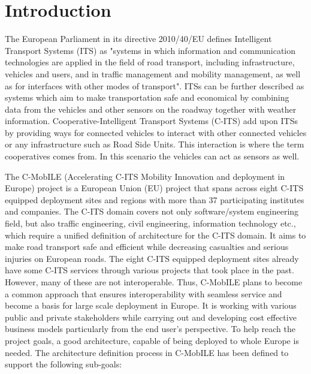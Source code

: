 \documentclass[conference]{IEEEtran}
\begin{document}
\section{Introduction}

The European Parliament in its directive 2010/40/EU \cite{ec} defines Intelligent Transport Systems (ITS) as "systems in which information and communication technologies are applied in the field of road transport, including infrastructure, vehicles and users, and in traffic management and mobility management, as well as for interfaces with other modes of transport".
ITSs can be further described as systems which aim to make transportation safe and economical by combining data from the vehicles and other sensors on the roadway together with weather information.
Cooperative-Intelligent Transport Systems (C-ITS) \cite{c-its} add upon ITSs by providing ways for connected vehicles to interact with other connected vehicles or any infrastructure such as Road Side Units.
This interaction is where the term cooperatives comes from.
In this scenario the vehicles can act as sensors as well.

The C-MobILE (Accelerating C-ITS Mobility Innovation and deployment in Europe) project is a European Union (EU) project that spans across eight C-ITS equipped deployment sites and regions with more than 37 participating institutes and companies.
The C-ITS domain covers not only software/system engineering field, but also traffic engineering, civil engineering, information technology etc., which require a unified definition of architecture for the C-ITS domain.
It aims to make road transport safe and efficient while decreasing casualties and serious injuries on European roads.
The eight C-ITS equipped deployment sites already have some C-ITS services through various projects that took place in the past.
However, many of these are not interoperable.
Thus, C-MobILE plans to become a common approach that ensures interoperability with seamless service and become a basis for large scale deployment in Europe.
It is working with various public and private stakeholders while carrying out and developing cost effective business models particularly from the end user’s perspective.
To help reach the project goals, a good architecture, capable of being deployed to whole Europe is needed.
The architecture definition process in C-MobILE has been defined to support the following sub-goals:
\end{document}
